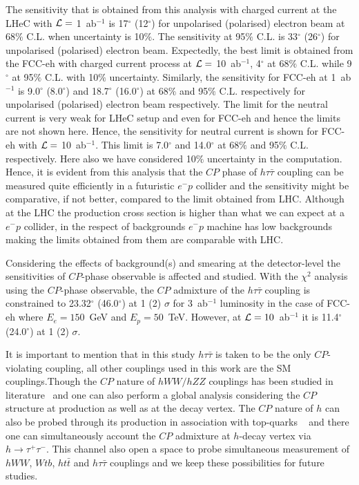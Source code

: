 \documentclass[pdftex,twocolumn,epjc3]{svjour3}          %
\begin{document}
\par The sensitivity that is obtained from this analysis with charged current at the LHeC with $\cal{L} =$ 1~ab$^{-1}$ is 17$^\circ$ (12$^\circ$) for unpolarised (polarised) electron beam at 68$\%$ C.L. when uncertainty is 10$\%$. The sensitivity at 95$\%$ C.L. is 33$^\circ$ (26$^\circ$) for unpolarised (polarised) electron beam. Expectedly, the best limit is obtained from the FCC-eh with charged current process at $\cal{L} =$ 10~ab$^{-1}$, 4$^\circ$ at 68$\%$ C.L. while 9$^\circ$ at 95$\%$ C.L. with 10$\%$ uncertainty. Similarly, the sensitivity for FCC-eh at 1~ab$^{-1}$ is 9.0$^\circ$ (8.0$^\circ$) and 18.7$^\circ$ (16.0$^\circ$) at 68$\%$ and 95$\%$ C.L. respectively for unpolarised (polarised) electron beam respectively. The limit for the neutral current is very weak for LHeC setup and even for FCC-eh and hence the limits are not shown here. Hence, the sensitivity for neutral current is shown for FCC-eh with $\cal{L} =$ 10~ab$^{-1}$. This limit is 7.0$^\circ$  and 14.0$^\circ$ at 68$\%$ and 95$\%$ C.L. respectively. Here also we have considered 10$\%$ uncertainty in the computation. Hence, it is evident from this analysis that the $CP$ phase of $h\tau\bar\tau$ coupling can be measured quite efficiently in a futuristic $e^-p$ collider and the sensitivity might be comparative, if not better, compared to the limit obtained from LHC. Although at the LHC the production cross section is higher than what we can expect at a $e^-p$ collider, in the respect of backgrounds $e^-p$ machine has low backgrounds making the limits obtained from them are comparable with LHC. 

Considering the effects of background(s) and smearing at the detector-level the sensitivities of $CP$-phase observable is affected and studied. With the $\chi^2$ analysis using the $CP$-phase observable, the $CP$ admixture of the $h\tau\bar{\tau}$ coupling is constrained to 23.32$^\circ$ (46.0$^\circ$) at 1 (2) $\sigma$ for 3~ab$^{-1}$ luminosity in the case of FCC-eh where $E_e = 150$~GeV and $E_p = 50$~TeV. However, at ${\cal L} = 10$~ab$^{-1}$ it is 11.4$^\circ$ (24.0$^\circ$) at 1 (2) $\sigma$.

\par It is important to mention that in this study $h\tau{\bar\tau}$ is taken to be the only $CP$-violating coupling, all other couplings used in this work are the SM couplings.Though the $CP$ nature of $hWW/hZZ$ couplings has been studied in literature~\cite{Biswal:2012mp,Kumar:2015kca} and one can also perform a global analysis considering the $CP$ structure at production as well as at the decay vertex. The $CP$ nature of $h$ can also be probed through its production in association with top-quarks   ~\cite{Coleppa:2017rgb} and there one can simultaneously account the $CP$ admixture at $h$-decay vertex via $h\to\tau^+\tau^-$. This channel also open a space to probe simultaneous measurement of $hWW$, $Wtb$, $ht\bar t$ and $h\tau\bar\tau$ couplings and we keep these possibilities for future studies. 
\end{document}
